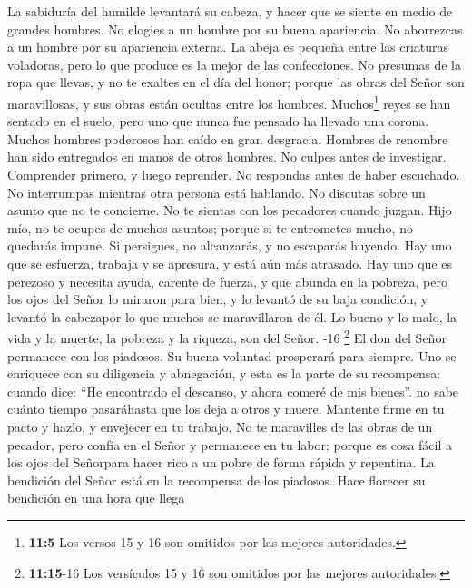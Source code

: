  La sabiduría del humilde levantará su cabeza, y hacer que
se siente en medio de grandes hombres.  No elogies a un
hombre por su buena apariencia. No aborrezcas a un hombre por su
apariencia externa.  La abeja es pequeña entre las
criaturas voladoras, pero lo que produce es la mejor de las
confecciones.  No presumas de la ropa que llevas, y no te
exaltes en el día del honor; porque las obras del Señor son
maravillosas, y sus obras están ocultas entre los hombres.
 Muchos\footnote{\textbf{11:5} Los versos 15 y 16 son
  omitidos por las mejores autoridades.} reyes se han sentado en el
suelo, pero uno que nunca fue pensado ha llevado una corona.
 Muchos hombres poderosos han caído en gran desgracia.
Hombres de renombre han sido entregados en manos de otros hombres.
 No culpes antes de investigar. Comprender primero, y
luego reprender.  No respondas antes de haber escuchado.
No interrumpas mientras otra persona está hablando.  No
discutas sobre un asunto que no te concierne. No te sientas con los
pecadores cuando juzgan.  Hijo mío, no te ocupes de
muchos asuntos; porque si te entrometes mucho, no quedarás impune. Si
persigues, no alcanzarás, y no escaparás huyendo.  Hay
uno que se esfuerza, trabaja y se apresura, y está aún más atrasado.
 Hay uno que es perezoso y necesita ayuda, carente de
fuerza, y que abunda en la pobreza, pero los ojos del Señor lo miraron
para bien, y lo levantó de su baja condición,  y levantó
la cabezapor lo que muchos se maravillaron de él.  Lo
bueno y lo malo, la vida y la muerte, la pobreza y la riqueza, son del
Señor. -16 \footnote{\textbf{11:15}-16 Los versículos 15
  y 16 son omitidos por las mejores autoridades.}  El don
del Señor permanece con los piadosos. Su buena voluntad prosperará para
siempre.  Uno se enriquece con su diligencia y
abnegación, y esta es la parte de su recompensa:  cuando
dice: ``He encontrado el descanso, y ahora comeré de mis bienes''. no
sabe cuánto tiempo pasaráhasta que los deja a otros y muere.
 Mantente firme en tu pacto y hazlo, y envejecer en tu
trabajo.  No te maravilles de las obras de un pecador,
pero confía en el Señor y permanece en tu labor; porque es cosa fácil a
los ojos del Señorpara hacer rico a un pobre de forma rápida y
repentina.  La bendición del Señor está en la recompensa
de los piadosos. Hace florecer su bendición en una hora que llega
